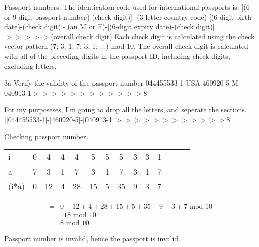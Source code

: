 \begin{question}{3}
Passport numbers. The identication code used for international passports is:
[(6 or 9-digit passport number)-(check digit)]-
(3 letter country code)-[(6-digit birth date)-(check digit)]-
(an M or F)-[(6-digit expiry date)-(check digit)]$>>>>>$(overall check digit)
Each check digit is calculated using the check vector pattern (7; 3; 1; 7; 3; 1; :::) mod 10.
The overall check digit is calculated with all of the preceding digits in the passport ID,
including check digits, excluding letters.
\end{question}


\begin{question}{3a} %
Verify the validity of the passport number
044455533-1-USA-460920-5-M-040913-1$>>>>>>>>>>>>$8

For my purposeses, I'm going to drop all the letters, and seperate the sections.
[[044455533-1]-[460920-5]-[040913-1]$>>>>>>>>>>>>$8]

Checking passport number.

\begin{tabular}{l|ccccccccccccc}
\hline
i     & 0  & 4  & 4  & 4  & 5  & 5  & 5  & 3  & 3  & 1 \\
a     & 7  & 3  & 1  & 7  & 3  & 1  & 7  & 3  & 1  & 7 \\
\hline
(i*a) & 0  & 12 & 4  & 28 & 15 & 5  & 35 & 9  & 3  & 7
\end{tabular}

\begin{align*}
=& 0  + 12 + 4  + 28 + 15 + 5  + 35 + 9  + 3  + 7 \textrm{ mod } 10\\
=& 118 \textrm{ mod } 10\\
=& 8 \textrm{ mod } 10
\end{align*}

Passport number is invalid, hence the passport is invalid.




\end{question}
